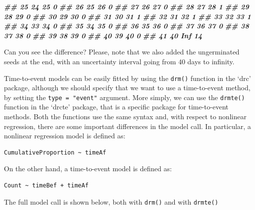 \documentclass[
]{book}
\newenvironment{Shaded}{\begin{snugshade}}{\end{snugshade}}
\newcommand{\DocumentationTok}[1]{\textcolor[rgb]{0.56,0.35,0.01}{\textbf{\textit{#1}}}}
\begin{document}
\begin{Shaded}
\begin{Highlighting}[]
\DocumentationTok{\#\# 25      24     25      0}
\DocumentationTok{\#\# 26      25     26      0}
\DocumentationTok{\#\# 27      26     27      0}
\DocumentationTok{\#\# 28      27     28      1}
\DocumentationTok{\#\# 29      28     29      0}
\DocumentationTok{\#\# 30      29     30      0}
\DocumentationTok{\#\# 31      30     31      1}
\DocumentationTok{\#\# 32      31     32      1}
\DocumentationTok{\#\# 33      32     33      1}
\DocumentationTok{\#\# 34      33     34      0}
\DocumentationTok{\#\# 35      34     35      0}
\DocumentationTok{\#\# 36      35     36      0}
\DocumentationTok{\#\# 37      36     37      0}
\DocumentationTok{\#\# 38      37     38      0}
\DocumentationTok{\#\# 39      38     39      0}
\DocumentationTok{\#\# 40      39     40      0}
\DocumentationTok{\#\# 41      40    Inf     14}
\end{Highlighting}
\end{Shaded}

Can you see the difference? Please, note that we also added the ungerminated seeds at the end, with an uncertainty interval going from 40 days to infinity.

Time-to-event models can be easily fitted by using the \texttt{drm()} function in the `drc' package, although we should specify that we want to use a time-to-event method, by setting the \texttt{type\ =\ "event"} argument. More simply, we can use the \texttt{drmte()} function in the `drcte' package, that is a specific package for time-to-event methods. Both the functions use the same syntax and, with respect to nonlinear regression, there are some important differences in the model call. In particular, a nonlinear regression model is defined as:

\begin{verbatim}
CumulativeProportion ~ timeAf
\end{verbatim}

On the other hand, a time-to-event model is defined as:

\begin{verbatim}
Count ~ timeBef + timeAf
\end{verbatim}

The full model call is shown below, both with \texttt{drm()} and with \texttt{drmte()}
\end{document}
